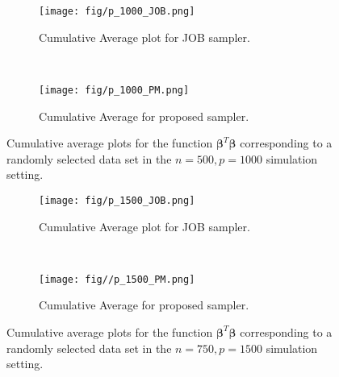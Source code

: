 \documentclass[noinfoline,11pt]{imsart}
\numberwithin{equation}{section}
\theoremstyle{plain}
\begin{document}
\begin{figure}[hbt!]
     \centering
     \begin{subfigure}[b]{0.8\textwidth}
         \centering
         \texttt{[image: fig/p\_1000\_JOB.png]}
         \caption{Cumulative Average plot  for JOB  sampler.}
         \label{fig:JOB_p_1000}
     \end{subfigure}\\
     \vspace{.1in}
     \begin{subfigure}[b]{0.8\textwidth}
         \centering
         \texttt{[image: fig/p\_1000\_PM.png]}
         \caption{Cumulative Average for proposed sampler.}
         \label{fig:prop_p_1000}
     \end{subfigure}
     \hfill
     \caption{Cumulative average plots for the function $\boldsymbol{\beta}^T\boldsymbol{\beta}$ corresponding to a randomly 
     selected data set in the $n=500, p=1000$ simulation setting.}
     \label{fig:p_1000}
  \end{figure}
  
  
\begin{figure}[hbt!]
     \centering
     \begin{subfigure}[hbt!]{0.8\textwidth}
         \centering
         \texttt{[image: fig/p\_1500\_JOB.png]}
         \caption{Cumulative Average plot  for JOB  sampler.}
         \label{fig:JOB_p_1500}
     \end{subfigure}\\
     \vspace{.1in}
     \begin{subfigure}[hbt!]{0.8\textwidth}
         \centering
         \texttt{[image: fig//p\_1500\_PM.png]}
         \caption{Cumulative Average for proposed sampler.}
         \label{fig:prop_p_1500}
     \end{subfigure}
     \hfill
     \caption{Cumulative average plots for the function $\boldsymbol{\beta}^T\boldsymbol{\beta}$ corresponding to a randomly 
     selected data set in the $n=750, p=1500$ simulation setting.}
       \label{fig:p_1500}
  \end{figure}
 
\end{document}
